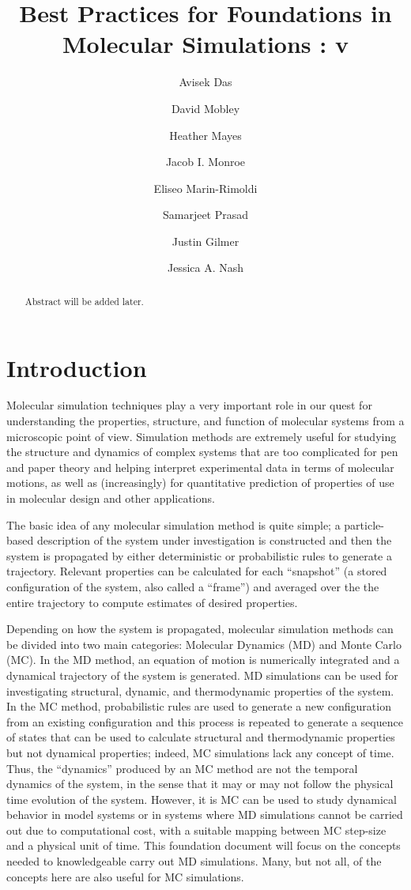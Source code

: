 \documentclass[9pt,bestpractices]{livecoms}
\title{Best Practices for Foundations in Molecular Simulations : v\versionnumber}
\author[1*]{Avisek Das}
\author[2]{David Mobley}
\author[1]{Heather Mayes}
\author[3]{Jacob I. Monroe}
\author[4]{Eliseo Marin-Rimoldi}
\author[5]{Samarjeet Prasad}
\author[6]{Justin Gilmer}
\author[7]{Jessica A. Nash}
\affil[1]{University of Michigan}
\affil[2]{University of California, Irvine}
\affil[3]{University of California, Santa Barbara}
\affil[4]{Univ 4}
\affil[5]{National Institutes of Standard and Technology}
\affil[6]{Univ 5}
\affil[7]{Univ 6}
\begin{document}
\maketitle

\begin{abstract}
Abstract will be added later.
\end{abstract}


\section{Introduction}

Molecular simulation techniques play a very important role in our quest for understanding the properties, structure, and function of molecular systems from a microscopic point of view.
Simulation methods are extremely useful for studying the structure and dynamics of complex systems that are too complicated for pen and paper theory and helping interpret experimental data in terms of molecular motions, as well as (increasingly) for quantitative prediction of properties of use in molecular design and other applications.

The basic idea of any molecular simulation method is quite simple; a particle-based description of the system under investigation is constructed and then the system is propagated by either deterministic or probabilistic rules to generate a trajectory.
Relevant properties can be calculated for each ``snapshot'' (a stored configuration of the system, also called a ``frame'') and averaged over the the entire trajectory to compute estimates of desired properties. 

Depending on how the system is propagated, molecular simulation methods can be divided into two main categories: Molecular Dynamics (MD) and Monte Carlo (MC).
In the MD method, an equation of motion is numerically integrated and a dynamical trajectory of the system is generated.
MD simulations can be used for investigating structural, dynamic, and thermodynamic properties of the system.
In the MC method, probabilistic rules are used to generate a new configuration from an existing configuration and this process is repeated to generate a sequence of states that can be used to calculate structural and thermodynamic properties but not dynamical properties; indeed, MC simulations lack any concept of time.
Thus, the ``dynamics'' produced by an MC method are not the temporal dynamics of the system, in the sense that it may or may not follow the physical time evolution of the system.
However, it is MC can be used  to study dynamical behavior in model systems or in systems where MD simulations cannot be carried out due to computational cost, with a suitable mapping between MC step-size and a physical unit of time.
This foundation document will focus on the concepts needed to knowledgeable carry out MD simulations. Many, but not all, of the concepts here are also useful for MC simulations. 
\end{document}
